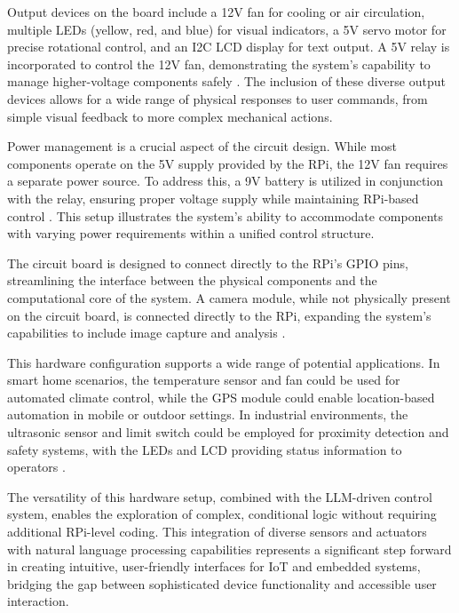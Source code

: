 \documentclass{ieeeaccess}
\begin{document}
Output devices on the board include a 12V fan for cooling or air circulation, multiple LEDs (yellow, red, and blue) for visual indicators, a 5V servo motor for precise rotational control, and an I2C LCD display for text output. A 5V relay is incorporated to control the 12V fan, demonstrating the system's capability to manage higher-voltage components safely \cite{smith2020}. The inclusion of these diverse output devices allows for a wide range of physical responses to user commands, from simple visual feedback to more complex mechanical actions.

Power management is a crucial aspect of the circuit design. While most components operate on the 5V supply provided by the RPi, the 12V fan requires a separate power source. To address this, a 9V battery is utilized in conjunction with the relay, ensuring proper voltage supply while maintaining RPi-based control \cite{monk2019}. This setup illustrates the system's ability to accommodate components with varying power requirements within a unified control structure.

The circuit board is designed to connect directly to the RPi's GPIO pins, streamlining the interface between the physical components and the computational core of the system. A camera module, while not physically present on the circuit board, is connected directly to the RPi, expanding the system's capabilities to include image capture and analysis \cite{pi_camera_2018}.

This hardware configuration supports a wide range of potential applications. In smart home scenarios, the temperature sensor and fan could be used for automated climate control, while the GPS module could enable location-based automation in mobile or outdoor settings. In industrial environments, the ultrasonic sensor and limit switch could be employed for proximity detection and safety systems, with the LEDs and LCD providing status information to operators \cite{mcmanus2021}.

The versatility of this hardware setup, combined with the LLM-driven control system, enables the exploration of complex, conditional logic without requiring additional RPi-level coding. This integration of diverse sensors and actuators with natural language processing capabilities represents a significant step forward in creating intuitive, user-friendly interfaces for IoT and embedded systems, bridging the gap between sophisticated device functionality and accessible user interaction.
\end{document}
